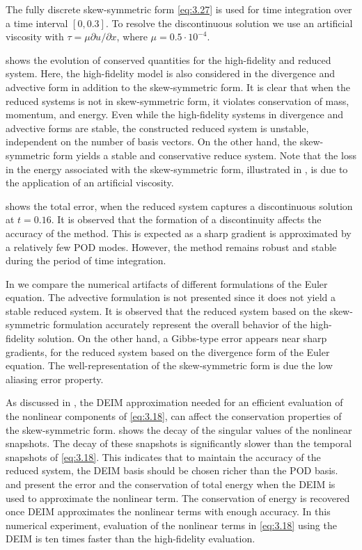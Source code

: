 The fully discrete skew-symmetric form \eqref{eq:3.27} is used for time integration over a time interval $[0,0.3]$. To resolve the discontinuous solution we use an artificial viscosity with $\tau = \mu \partial u / \partial x$, where $\mu = 0.5 \cdot 10^{-4}$. 

		 shows the evolution of conserved quantities for the high-fidelity and reduced system. Here, the high-fidelity model is also considered in the divergence and advective form in addition to the skew-symmetric form. It is clear that when the reduced systems is not in skew-symmetric form, it violates conservation of mass, momentum, and energy. Even while the high-fidelity systems in divergence and advective forms are stable, the constructed reduced system is unstable, independent on the number of basis vectors. On the other hand, the skew-symmetric form yields a stable and conservative reduce system. Note that the loss in the energy associated with the skew-symmetric form, illustrated in , is due to the application of an artificial viscosity. 

 shows the total error, when the reduced system captures a discontinuous solution at $t=0.16$. It is observed that the formation of a discontinuity affects the accuracy of the method. This is expected as a sharp gradient is approximated by a relatively few POD modes. However, the method remains robust and stable during the period of time integration.

In  we compare the numerical artifacts of different formulations of the Euler equation. The advective formulation is not presented since it does not yield a stable reduced system. It is observed that the reduced system based on the skew-symmetric formulation accurately represent the overall behavior of the high-fidelity solution. On the other hand, a Gibbs-type error \cite{thompson1992fourier} appears near sharp gradients, for the reduced system based on the divergence form of the Euler equation. The well-representation of the skew-symmetric form is due the low aliasing error property. 

As discussed in , the DEIM approximation needed for an efficient evaluation of the nonlinear components of \eqref{eq:3.18}, can affect the conservation properties of the skew-symmetric form.  shows the decay of the singular values of the nonlinear snapshots. The decay of these snapshots is significantly slower than the temporal snapshots of \eqref{eq:3.18}. This indicates that to maintain the accuracy of the reduced system, the DEIM basis should be chosen richer than the POD basis.  and  present the error and the conservation of total energy when the DEIM is used to approximate the nonlinear term. The conservation of energy is recovered once DEIM approximates the nonlinear terms with enough accuracy. 
In this numerical experiment, evaluation of the nonlinear terms in \eqref{eq:3.18} using the DEIM is ten times faster than the high-fidelity evaluation.

